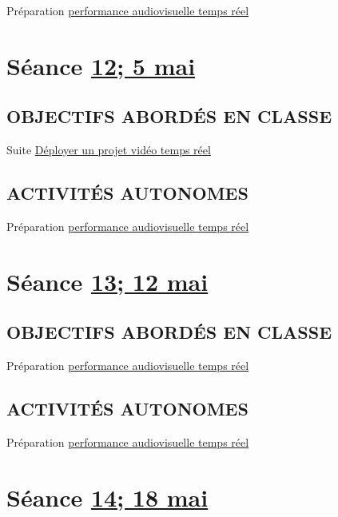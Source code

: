 \documentclass[
]{book}
\begin{document}
Préparation \protect\hyperlink{sommatif_5}{performance audiovisuelle temps réel}

\hypertarget{semaine_14}{%
\section{\texorpdfstring{Séance \protect\hyperlink{semaine_14}{12; 5 mai}}{Séance 12; 5 mai}}\label{semaine_14}}

\hypertarget{objectifs-aborduxe9s-en-classe-13}{%
\subsection{OBJECTIFS ABORDÉS EN CLASSE}\label{objectifs-aborduxe9s-en-classe-13}}

Suite \protect\hyperlink{deployer}{Déployer un projet vidéo temps réel}

\hypertarget{activituxe9s-autonomes-13}{%
\subsection{ACTIVITÉS AUTONOMES}\label{activituxe9s-autonomes-13}}

Préparation \protect\hyperlink{sommatif_5}{performance audiovisuelle temps réel}

\hypertarget{semaine_15}{%
\section{\texorpdfstring{Séance \protect\hyperlink{semaine_15}{13; 12 mai}}{Séance 13; 12 mai}}\label{semaine_15}}

\hypertarget{objectifs-aborduxe9s-en-classe-14}{%
\subsection{OBJECTIFS ABORDÉS EN CLASSE}\label{objectifs-aborduxe9s-en-classe-14}}

Préparation \protect\hyperlink{sommatif_5}{performance audiovisuelle temps réel}

\hypertarget{activituxe9s-autonomes-14}{%
\subsection{ACTIVITÉS AUTONOMES}\label{activituxe9s-autonomes-14}}

Préparation \protect\hyperlink{sommatif_5}{performance audiovisuelle temps réel}

\hypertarget{semaine_16}{%
\section{\texorpdfstring{Séance \protect\hyperlink{semaine_16}{14; 18 mai}}{Séance 14; 18 mai}}\label{semaine_16}}
\end{document}

